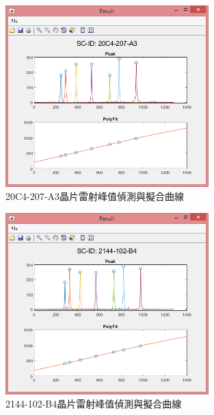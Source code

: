 \begin{figure}[H] %
	\centering %
	\vspace{0.8cm}
	\includegraphics[width=0.7\textwidth]{figures/Result/比較/A3-L.jpg} %
	\caption{20C4-207-A3晶片雷射峰值偵測與擬合曲線} %
	\label{A3晶片雷射峰值偵測與擬合曲線} %
\end{figure}
\begin{figure}[H] %
	\centering %
	\vspace{0.8cm}
	\includegraphics[width=0.7\textwidth]{figures/Result/比較/B4-L.jpg} %
	\caption{2144-102-B4晶片雷射峰值偵測與擬合曲線} %
	\label{B4晶片雷射峰值偵測與擬合曲線} %
\end{figure}

